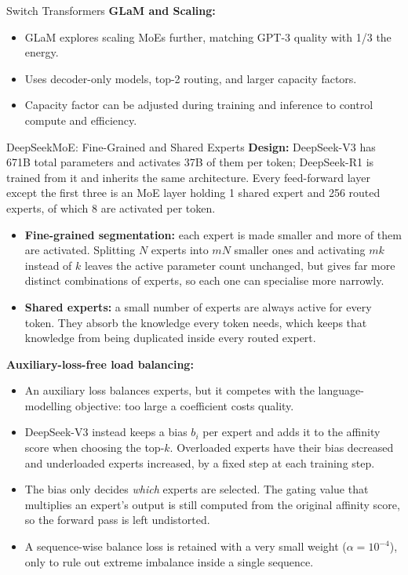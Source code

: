 \begin{frame}[allowframebreaks]{Switch Transformers}
    \textbf{GLaM and Scaling:}
    \begin{itemize}
        \item GLaM explores scaling MoEs further, matching GPT-3 quality with 1/3 the energy.
        \item Uses decoder-only models, top-2 routing, and larger capacity factors.
        \item Capacity factor can be adjusted during training and inference to control compute and efficiency.
    \end{itemize}
\end{frame}

\begin{frame}[allowframebreaks]{DeepSeekMoE: Fine-Grained and Shared Experts}
    \textbf{Design:} DeepSeek-V3 has 671B total parameters and activates 37B of them per token; DeepSeek-R1 is trained from it and inherits the same architecture. Every feed-forward layer except the first three is an MoE layer holding 1 shared expert and 256 routed experts, of which 8 are activated per token.

    \begin{itemize}
        \item \textbf{Fine-grained segmentation:} each expert is made smaller and more of them are activated. Splitting $N$ experts into $mN$ smaller ones and activating $mk$ instead of $k$ leaves the active parameter count unchanged, but gives far more distinct combinations of experts, so each one can specialise more narrowly.
        \item \textbf{Shared experts:} a small number of experts are always active for every token. They absorb the knowledge every token needs, which keeps that knowledge from being duplicated inside every routed expert.
    \end{itemize}

\framebreak

    \textbf{Auxiliary-loss-free load balancing:}
    \begin{itemize}
        \item An auxiliary loss balances experts, but it competes with the language-modelling objective: too large a coefficient costs quality.
        \item DeepSeek-V3 instead keeps a bias $b_i$ per expert and adds it to the affinity score when choosing the top-$k$. Overloaded experts have their bias decreased and underloaded experts increased, by a fixed step at each training step.
        \item The bias only decides \emph{which} experts are selected. The gating value that multiplies an expert's output is still computed from the original affinity score, so the forward pass is left undistorted.
        \item A sequence-wise balance loss is retained with a very small weight ($\alpha = 10^{-4}$), only to rule out extreme imbalance inside a single sequence.
    \end{itemize}
\end{frame}

